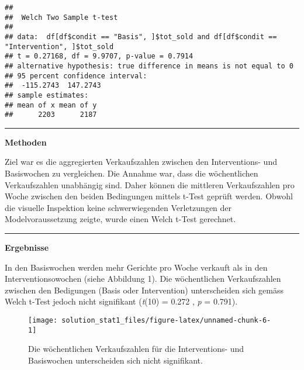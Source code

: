\documentclass[
]{article}
\begin{document}
\begin{verbatim}
## 
##  Welch Two Sample t-test
## 
## data:  df[df$condit == "Basis", ]$tot_sold and df[df$condit == "Intervention", ]$tot_sold
## t = 0.27168, df = 9.9707, p-value = 0.7914
## alternative hypothesis: true difference in means is not equal to 0
## 95 percent confidence interval:
##  -115.2743  147.2743
## sample estimates:
## mean of x mean of y 
##      2203      2187
\end{verbatim}

\begin{center}\rule{0.5\linewidth}{0.5pt}\end{center}

\textbf{Methoden}

Ziel war es die aggregierten Verkaufszahlen zwischen den Interventions-
und Basiswochen zu vergleichen. Die Annahme war, dass die wöchentlichen
Verkaufszahlen unabhängig sind. Daher können die mittleren
Verkaufszahlen pro Woche zwischen den beiden Bedingungen mittels t-Test
geprüft werden. Obwohl die visuelle Inspektion keine schwerwiegenden
Verletzungen der Modelvoraussetzung zeigte, wurde einen Welch t-Test
gerechnet.

\begin{center}\rule{0.5\linewidth}{0.5pt}\end{center}

\textbf{Ergebnisse}

In den Basiswochen werden mehr Gerichte pro Woche verkauft als in den
Interventionsowochen (siehe Abbildung 1). Die wöchentlichen
Verkaufszahlen zwischen den Bedigungen (Basis oder Intervention)
unterscheiden sich gemäss Welch t-Test jedoch nicht signifikant
(\emph{t}(10) = 0.272 , \emph{p} = 0.791).

\begin{figure}
\texttt{[image: solution\_stat1\_files/figure-latex/unnamed-chunk-6-1]} \caption{Die wöchentlichen Verkaufszahlen für die Interventions- und Basiswochen unterscheiden sich nicht signifikant.}\label{fig:unnamed-chunk-6}
\end{figure}
\end{document}
